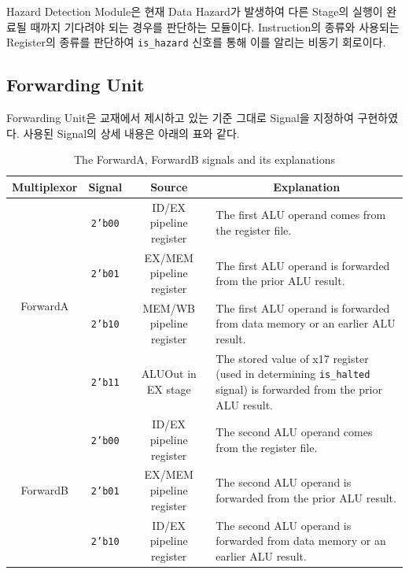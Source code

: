 \documentclass[openright, a4paper]{article}
\newcommand{\code}[1]{\texttt{#1}}
\begin{document}
Hazard Detection Module은 현재 Data Hazard가 발생하여 다른 Stage의 실행이 완료될 때까지 기다려야 되는 경우를 판단하는 모듈이다. Instruction의 종류와 사용되는 Register의 종류를 판단하여 \code{is_hazard} 신호를 통해 이를 알리는 비동기 회로이다.

\subsection{Forwarding Unit}

Forwarding Unit은 교재에서 제시하고 있는 기준 그대로 Signal을 지정하여 구현하였다. 사용된 Signal의 상세 내용은 아래의 표와 같다.

\begin{table}[h!]
    \centering
    \renewcommand{\arraystretch}{1.2}
    \begin{tabular}{c|c|c|p{6cm}}
    \hline
    Multiplexor & Signal     & Source                   & \multicolumn{1}{c}{Explanation}                                                                                                    \\
    \hline
    \multirow{4}{*}{ForwardA} & \code{2'b00} & ID/EX pipeline register  & The first ALU operand comes from the register file.                                                            \\
    \cline{2-4}
    & \code{2'b01} & EX/MEM pipeline register & The first ALU operand is forwarded from the prior ALU result.                                                  \\
    \cline{2-4}
    & \code{2'b10} & MEM/WB pipeline register & The first ALU operand is forwarded from data memory or an earlier ALU result.                                  \\
    \cline{2-4}
    & \code{2'b11} & ALUOut in EX stage       & The stored value of x17 register (used in determining \code{is\_halted} signal) is forwarded from the prior ALU result. \\
    \hline
    \multirow{3}{*}{ForwardB} & \code{2'b00} & ID/EX pipeline register  & The second ALU operand comes from the register file.                                                           \\
    \cline{2-4}
    & \code{2'b01} & EX/MEM pipeline register & The second ALU operand is forwarded from the prior ALU result.                                                 \\
    \cline{2-4}
    & \code{2'b10} & ID/EX pipeline register  & The second ALU operand is forwarded from data memory or an earlier ALU result.                                \\
    \hline
    \end{tabular}
    \caption{The ForwardA, ForwardB signals and its explanations}
\end{table}
\end{document}

